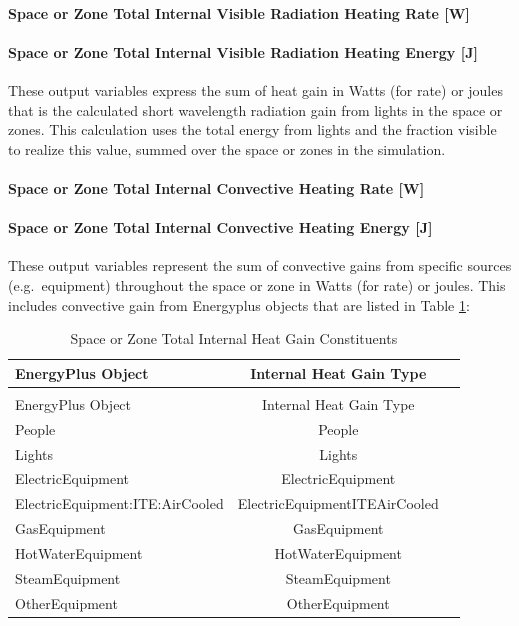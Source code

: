 \paragraph{Space or Zone Total Internal Visible Radiation Heating Rate {[}W{]}}\label{zone-total-internal-visible-radiation-heating-rate-w}

\paragraph{Space or Zone Total Internal Visible Radiation Heating Energy {[}J{]}}\label{zone-total-internal-visible-radiation-heating-energy-j}

These output variables express the sum of heat gain in Watts (for rate) or joules that is the calculated short wavelength radiation gain from lights in the space or zones. This calculation uses the total energy from lights and the fraction visible to realize this value, summed over the space or zones in the simulation.

\paragraph{Space or Zone Total Internal Convective Heating Rate {[}W{]}}\label{zone-total-internal-convective-heating-rate-w}

\paragraph{Space or Zone Total Internal Convective Heating Energy {[}J{]}}\label{zone-total-internal-convective-heating-energy-j}

These output variables represent the sum of convective gains from specific sources (e.g.~equipment) throughout the space or zone in Watts (for rate) or joules. This includes convective gain from Energyplus objects that are listed in Table \ref{table:space-or-zone-total-internal-heat-gain-constituents}:

\begin{longtable}[c]{@{}lcc@{}}
	\caption{Space or Zone Total Internal Heat Gain Constituents} \label{table:space-or-zone-total-internal-heat-gain-constituents} \tabularnewline
	\toprule
	EnergyPlus Object &  Internal Heat Gain Type \tabularnewline
	\midrule
	\endfirsthead

	\caption[]{Space or Zone Total Internal Heat Gain Constituents} \tabularnewline
	\toprule
	EnergyPlus Object &  Internal Heat Gain Type \tabularnewline
	\midrule
	\endhead

	People   &  People \tabularnewline
	Lights   &  Lights \tabularnewline
	ElectricEquipment   &  ElectricEquipment \tabularnewline
	ElectricEquipment:ITE:AirCooled   &  ElectricEquipmentITEAirCooled \tabularnewline
	GasEquipment   &  GasEquipment \tabularnewline
	HotWaterEquipment   &  HotWaterEquipment \tabularnewline
	SteamEquipment   &  SteamEquipment \tabularnewline
	OtherEquipment   &  OtherEquipment \tabularnewline

	\bottomrule

\end{longtable}

